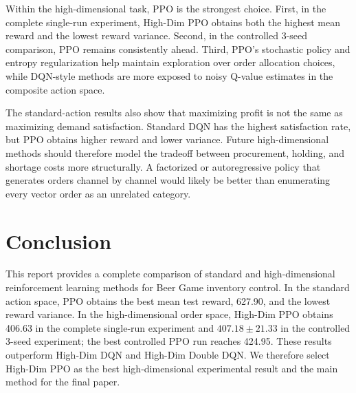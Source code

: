 \documentclass[nohyperref]{article}
\begin{document}
Within the high-dimensional task, PPO is the strongest choice. First, in the complete single-run experiment, High-Dim PPO obtains both the highest mean reward and the lowest reward variance. Second, in the controlled 3-seed comparison, PPO remains consistently ahead. Third, PPO's stochastic policy and entropy regularization help maintain exploration over order allocation choices, while DQN-style methods are more exposed to noisy Q-value estimates in the composite action space.

The standard-action results also show that maximizing profit is not the same as maximizing demand satisfaction. Standard DQN has the highest satisfaction rate, but PPO obtains higher reward and lower variance. Future high-dimensional methods should therefore model the tradeoff between procurement, holding, and shortage costs more structurally. A factorized or autoregressive policy that generates orders channel by channel would likely be better than enumerating every vector order as an unrelated category.

\section{Conclusion}

This report provides a complete comparison of standard and high-dimensional reinforcement learning methods for Beer Game inventory control. In the standard action space, PPO obtains the best mean test reward, 627.90, and the lowest reward variance. In the high-dimensional order space, High-Dim PPO obtains 406.63 in the complete single-run experiment and $407.18\pm21.33$ in the controlled 3-seed experiment; the best controlled PPO run reaches 424.95. These results outperform High-Dim DQN and High-Dim Double DQN. We therefore select High-Dim PPO as the best high-dimensional experimental result and the main method for the final paper.
\end{document}
